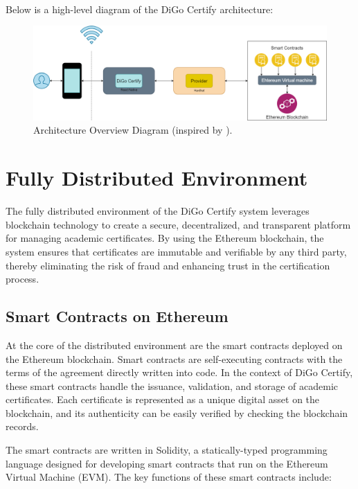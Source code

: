 \paragraph{}
Below is a high-level diagram of the DiGo Certify architecture:

\begin{figure}[H]
    \centering
    \includegraphics[width=1\textwidth]{../diagrams/architecture-overview.drawio.png}
    \caption{Architecture Overview Diagram (inspired by \cite{geeksforgeeks-dApps}).}
    \label{fig:architecture-overview}
\end{figure}

\section{Fully Distributed Environment}\label{sec:fully-distributed-environment}

The fully distributed environment of the DiGo Certify system leverages blockchain technology to create a secure, decentralized, and transparent platform for managing academic certificates. By using the Ethereum blockchain, the system ensures that certificates are immutable and verifiable by any third party, thereby eliminating the risk of fraud and enhancing trust in the certification process.

\subsection{Smart Contracts on Ethereum}

At the core of the distributed environment are the smart contracts deployed on the Ethereum blockchain. Smart contracts are self-executing contracts with the terms of the agreement directly written into code. In the context of DiGo Certify, these smart contracts handle the issuance, validation, and storage of academic certificates. Each certificate is represented as a unique digital asset on the blockchain, and its authenticity can be easily verified by checking the blockchain records.

The smart contracts are written in Solidity, a statically-typed programming language designed for developing smart contracts that run on the Ethereum Virtual Machine (EVM). The key functions of these smart contracts include:

